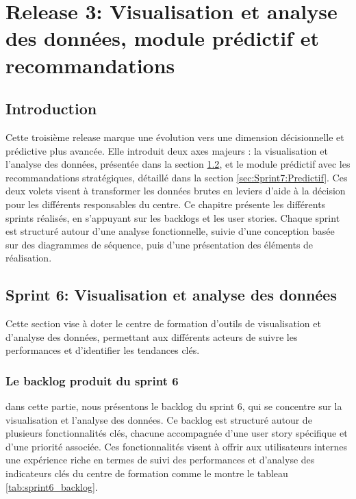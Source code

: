\chapter{ Release 3: Visualisation et analyse des données, module prédictif et recommandations}
\minitoc
\newpage
{}

\section{Introduction}
Cette troisième release marque une évolution vers une dimension décisionnelle et prédictive plus avancée. Elle introduit deux axes majeurs : la visualisation et l'analyse des données, présentée dans la section \ref{sec:Sprint6:Visualisation}, et le module prédictif avec les recommandations stratégiques, détaillé dans la section \ref{sec:Sprint7:Predictif}. Ces deux volets visent à transformer les données brutes en leviers d'aide à la décision pour les différents responsables du centre.
Ce chapitre présente les différents sprints réalisés, en s'appuyant sur les backlogs et les user stories. Chaque sprint est structuré autour d'une analyse fonctionnelle, suivie d'une conception basée sur des diagrammes de séquence, puis d'une présentation des éléments de réalisation.
\section{Sprint 6: Visualisation et analyse des données}
\label{sec:Sprint6:Visualisation}

Cette section vise à doter le centre de formation d'outils de visualisation et d'analyse des données, permettant aux différents acteurs de suivre les performances et d'identifier les tendances clés.
\subsection{Le backlog produit du sprint 6}
 dans cette partie, nous présentons le backlog du sprint 6, qui se concentre sur la visualisation et l'analyse des données. Ce backlog est structuré autour de plusieurs fonctionnalités clés, chacune accompagnée d'une user story spécifique et d'une priorité associée. Ces fonctionnalités visent à offrir aux utilisateurs internes une expérience riche en termes de suivi des performances et d'analyse des indicateurs clés du centre de formation comme le montre le tableau \ref{tab:sprint6_backlog}.
 
